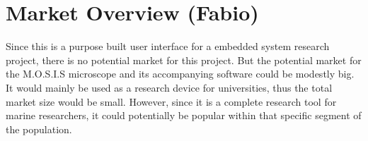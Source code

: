\section{Market Overview (Fabio)}
Since this is a purpose built user interface for a embedded system research project, there is no potential market for this project. But the potential market for the M.O.S.I.S microscope and its accompanying software could be modestly big. It would mainly be used as a research device for universities, thus the total market size would be small. However, since it is a complete research tool for marine researchers, it could potentially be popular within that specific segment of the population.